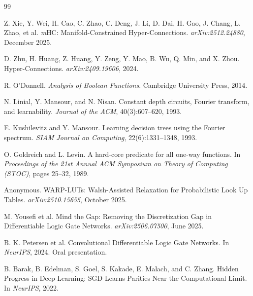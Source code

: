 \documentclass[Royal,times,sageh]{sagej}
\newcommand{\mHC}{\textit{m}HC}
\begin{document}
\begin{thebibliography}{99}

Z. Xie, Y. Wei, H. Cao, C. Zhao, C. Deng, J. Li, D. Dai, H. Gao, J. Chang, L. Zhao, et al.
\newblock \mHC: Manifold-Constrained Hyper-Connections.
\newblock \textit{arXiv:2512.24880}, December 2025.

D. Zhu, H. Huang, Z. Huang, Y. Zeng, Y. Mao, B. Wu, Q. Min, and X. Zhou.
\newblock Hyper-Connections.
\newblock \textit{arXiv:2409.19606}, 2024.

R. O'Donnell.
\newblock \textit{Analysis of Boolean Functions}.
\newblock Cambridge University Press, 2014.

N. Linial, Y. Mansour, and N. Nisan.
\newblock Constant depth circuits, Fourier transform, and learnability.
\newblock \textit{Journal of the ACM}, 40(3):607--620, 1993.

E. Kushilevitz and Y. Mansour.
\newblock Learning decision trees using the Fourier spectrum.
\newblock \textit{SIAM Journal on Computing}, 22(6):1331--1348, 1993.

O. Goldreich and L. Levin.
\newblock A hard-core predicate for all one-way functions.
\newblock In \textit{Proceedings of the 21st Annual ACM Symposium on Theory of Computing (STOC)}, pages 25--32, 1989.

Anonymous.
\newblock WARP-LUTs: Walsh-Assisted Relaxation for Probabilistic Look Up Tables.
\newblock \textit{arXiv:2510.15655}, October 2025.

M. Yousefi et al.
\newblock Mind the Gap: Removing the Discretization Gap in Differentiable Logic Gate Networks.
\newblock \textit{arXiv:2506.07500}, June 2025.

B. K. Petersen et al.
\newblock Convolutional Differentiable Logic Gate Networks.
\newblock In \textit{NeurIPS}, 2024. Oral presentation.

B. Barak, B. Edelman, S. Goel, S. Kakade, E. Malach, and C. Zhang.
\newblock Hidden Progress in Deep Learning: SGD Learns Parities Near the Computational Limit.
\newblock In \textit{NeurIPS}, 2022.


\end{thebibliography}
\end{document}
